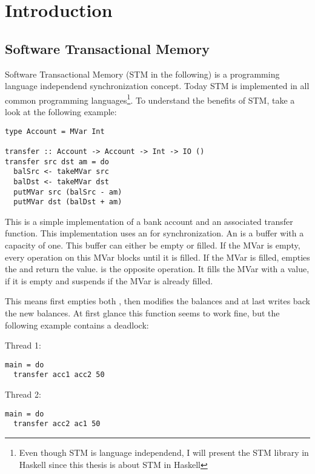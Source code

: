 
\chapter{Introduction} 

\label{Chapter1} 

\section{Software Transactional Memory}
Software Transactional Memory (STM in the following) is a programming language independend synchronization concept. Today STM is implemented 
in all common programming languages\footnote{Even though STM is language independend, I will present the STM library in Haskell since this thesis is
about STM in Haskell}. To understand the benefits of STM, take a look at the following example:
\begin{lstlisting}
type Account = MVar Int

transfer :: Account -> Account -> Int -> IO ()
transfer src dst am = do
  balSrc <- takeMVar src
  balDst <- takeMVar dst
  putMVar src (balSrc - am)
  putMVar dst (balDst + am)
\end{lstlisting}
This is a simple implementation of a bank account and an associated transfer function. This implementation uses an 
for synchronization. An  is a buffer with a capacity of one. This buffer can either be empty or filled. If the MVar is empty,
every  operation on this MVar blocks until it is filled. If the MVar is filled,  empties the 
 and return the value.  is the opposite operation. It fills the MVar with a value, if it is empty and 
suspends if the MVar is already filled.

This means  first empties both , then modifies the balances and at last writes back the new balances.
At first glance this function seems to work fine, but the following example contains a deadlock:
\par\noindent
\begin{minipage}[t]{.45\textwidth}
Thread 1:
\begin{lstlisting}[frame=lrtb]
main = do
  transfer acc1 acc2 50
\end{lstlisting}
\end{minipage}
\hfill
\begin{minipage}[t]{.45\textwidth}
Thread 2:
\begin{lstlisting}[frame=lrtb]
main = do
  transfer acc2 ac1 50
\end{lstlisting}
\end{minipage}

